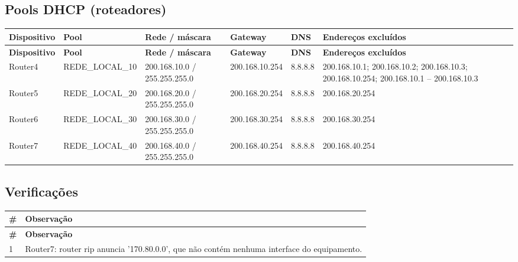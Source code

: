 \subsection{Pools DHCP (roteadores)}
\begingroup\scriptsize\setlength{\tabcolsep}{3pt}
\begin{longtable}{@{}p{}p{}p{}p{}p{}p{}@{}}
\toprule \textbf{Dispositivo} & \textbf{Pool} & \textbf{Rede / máscara} & \textbf{Gateway} & \textbf{DNS} & \textbf{Endereços excluídos} \\\midrule\endfirsthead
\toprule \textbf{Dispositivo} & \textbf{Pool} & \textbf{Rede / máscara} & \textbf{Gateway} & \textbf{DNS} & \textbf{Endereços excluídos} \\\midrule\endhead
Router4 & REDE\_LOCAL\_10 & 200.168.10.0 / 255.255.255.0 & 200.168.10.254 & 8.8.8.8 & 200.168.10.1; 200.168.10.2; 200.168.10.3; 200.168.10.254; 200.168.10.1 – 200.168.10.3 \\
Router5 & REDE\_LOCAL\_20 & 200.168.20.0 / 255.255.255.0 & 200.168.20.254 & 8.8.8.8 & 200.168.20.254 \\
Router6 & REDE\_LOCAL\_30 & 200.168.30.0 / 255.255.255.0 & 200.168.30.254 & 8.8.8.8 & 200.168.30.254 \\
Router7 & REDE\_LOCAL\_40 & 200.168.40.0 / 255.255.255.0 & 200.168.40.254 & 8.8.8.8 & 200.168.40.254 \\
\bottomrule
\end{longtable}\endgroup

\subsection{Verificações}
\begingroup\scriptsize\setlength{\tabcolsep}{3pt}
\begin{longtable}{@{}p{}p{}@{}}
\toprule \textbf{\#} & \textbf{Observação} \\\midrule\endfirsthead
\toprule \textbf{\#} & \textbf{Observação} \\\midrule\endhead
1 & Router7: router rip anuncia '170.80.0.0', que não contém nenhuma interface do equipamento. \\
\bottomrule
\end{longtable}\endgroup

